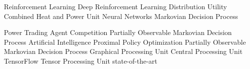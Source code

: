\begin       {acronym}[Bash]
	         {Reinforcement Learning}
	     {Deep Reinforcement Learning}
	         {Distribution Utility}
	        {Combined Heat and Power Unit}
	         {Neural Networks}
	        {Markovian Decision Process}

	   {Power Trading Agent Competition} 
	      {Partially Observable Markovian Decision Process}
	         {Artificial Intelligence}
	        {Proximal Policy Optimization}
	      {Partially Observable Markovian Decision Process}
	        {Graphical Processing Unit}
	        {Central Processing Unit}
	         {TensorFlow}
	        {Tensor Processing Unit}
	       {state-of-the-art}
\end       {acronym}
